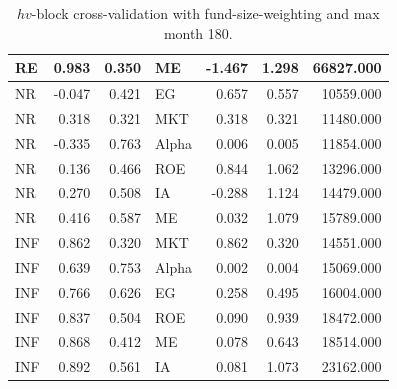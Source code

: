 \documentclass[12pt]{article}
\begin{document}
\begin{table}[ht]
\begin{tabular}{lrrlrrr}
RE & 0.983 & 0.350 & ME & -1.467 & 1.298 & 66827.000 \\ 
\hline
NR & -0.047 & 0.421 & EG & 0.657 & 0.557 & 10559.000 \\ 
NR & 0.318 & 0.321 & MKT & 0.318 & 0.321 & 11480.000 \\ 
NR & -0.335 & 0.763 & Alpha & 0.006 & 0.005 & 11854.000 \\ 
NR & 0.136 & 0.466 & ROE & 0.844 & 1.062 & 13296.000 \\ 
NR & 0.270 & 0.508 & IA & -0.288 & 1.124 & 14479.000 \\ 
NR & 0.416 & 0.587 & ME & 0.032 & 1.079 & 15789.000 \\ 
\hline
INF & 0.862 & 0.320 & MKT & 0.862 & 0.320 & 14551.000 \\ 
INF & 0.639 & 0.753 & Alpha & 0.002 & 0.004 & 15069.000 \\ 
INF & 0.766 & 0.626 & EG & 0.258 & 0.495 & 16004.000 \\ 
INF & 0.837 & 0.504 & ROE & 0.090 & 0.939 & 18472.000 \\ 
INF & 0.868 & 0.412 & ME & 0.078 & 0.643 & 18514.000 \\ 
INF & 0.892 & 0.561 & IA & 0.081 & 1.073 & 23162.000 \\ 
		\hline
		\hline
	\end{tabular}
	\caption{$hv$-block cross-validation with fund-size-weighting and max month 180.} 
	\label{tab:cv_180_FW_VYP_SL}
\end{table}
\end{document}

